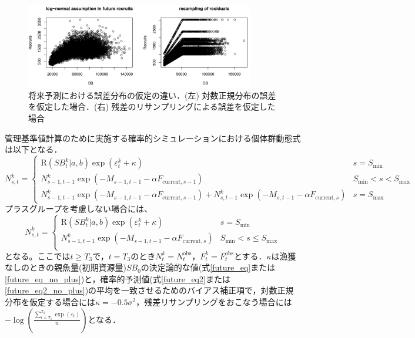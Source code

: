 \documentclass[11pt]{jsarticle}
\begin{document}
\begin{figure}[t]
  \includegraphics[width=10cm]{fig_resample.png}
  \caption{将来予測における誤差分布の仮定の違い．(左) 対数正規分布の誤差を仮定した場合．(右) 残差のリサンプリングによる誤差を仮定した場合}
  \label{fig_resample}
\end{figure}

管理基準値計算のために実施する確率的シミュレーションにおける個体群動態式は以下となる．
\begin{equation}
  N_{s,t}^k = \begin{cases}
    \mathrm{R}(S\!B_{t}^k|a,b) \exp (\varepsilon_t^k + \kappa) &     s = S_\mathrm{min} \\    
    N_{s-1, t-1}^k  \exp(-M_{s-1,t-1}-\alpha F_{\mathrm{current},s-1} )  &    S_\mathrm{min} < s < S_\mathrm{max} \\
    N_{s-1, t-1}^k  \exp(-M_{s-1,t-1}-\alpha F_{\mathrm{current},s-1} ) + N_{s,t-1}^k  \exp(-M_{s,t-1} - \alpha F_{\mathrm{current},s} ) &   s=S_{\mathrm{max}}
  \end{cases}
  \label{future_eq2}
\end{equation}
プラスグループを考慮しない場合には、
\begin{equation}
  N_{s,t}^k = \begin{cases}
    \mathrm{R}(S\!B_{t}^k|a,b) \exp (\varepsilon_t^k + \kappa) &     s = S_\mathrm{min} \\    
    N_{s-1, t-1}^k  \exp(-M_{s-1,t-1}-\alpha F_{\mathrm{current},s} )  &    S_\mathrm{min} < s \leq S_\mathrm{max} \\
  \end{cases}
  \label{future_eq2_no_plus}
\end{equation}
となる。ここでは$t \geq T_3$で，$t=T_3$のとき$N_t^k=N_t^{\mathrm{obs}}$，$F_t^k=F_t^{\mathrm{obs}}$とする．$\kappa$は漁獲なしのときの親魚量(初期資源量)$S\!B_0$の決定論的な値(式\ref{future_eq}または\ref{future_eq_no_plus})と，確率的予測値(式\ref{future_eq2}または\ref{future_eq2_no_plus})の平均を一致させるためのバイアス補正項で，対数正規分布を仮定する場合には$\kappa=-0.5\sigma^2$，残差リサンプリングをおこなう場合には$-\log( \frac{\sum_{t=T_1}^{T_2} \exp(\varepsilon_t)}{n} )$となる．
\end{document}
